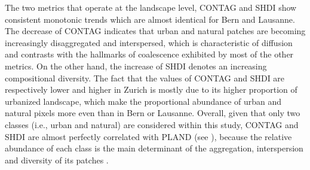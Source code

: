 \documentclass[10pt,letterpaper]{article}
\begin{document}
The two metrics that operate at the landscape level, CONTAG and SHDI show consistent monotonic trends which are almost identical for Bern and Lausanne.
The decrease of CONTAG indicates that urban and natural patches are becoming increasingly disaggregated and interspersed, which is characteristic of diffusion and contrasts with the hallmarks of coalescence exhibited by most of the other metrics.
On the other hand, the increase of SHDI denotes an increasing compositional diversity.
The fact that the values of CONTAG and SHDI are respectively lower and higher in Zurich is mostly due to its higher proportion of urbanized landscape, which make the proportional abundance of urban and natural pixels more even than in Bern or Lausanne.
Overall, given that only two classes (i.e., urban and natural) are considered within this study, CONTAG and SHDI are almost perfectly correlated with PLAND (see ), because the relative abundance of each class is the main determinant of the aggregation, interspersion and diversity of its patches \cite{mcgarigal2012fragstats}.

\end{document}
